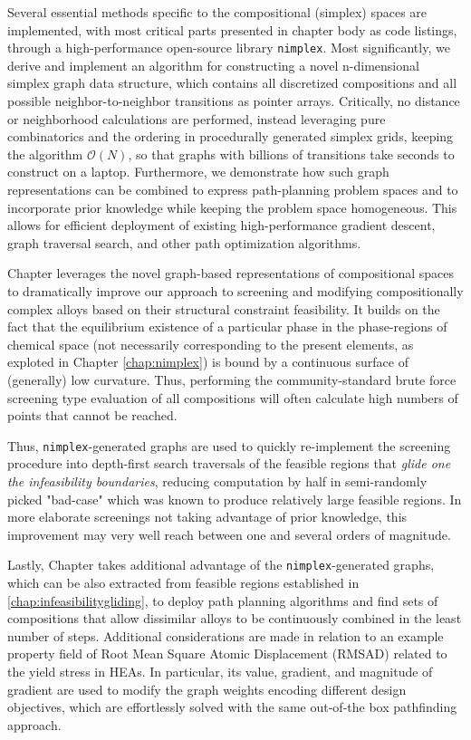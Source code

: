 Several essential methods specific to the compositional (simplex) spaces are implemented, with most critical parts presented in chapter body as code listings, through a high-performance open-source library \texttt{nimplex}. Most significantly, we derive and implement an algorithm for constructing a novel n-dimensional simplex graph data structure, which contains all discretized compositions and all possible neighbor-to-neighbor transitions as pointer arrays. Critically, no distance or neighborhood calculations are performed, instead leveraging pure combinatorics and the ordering in procedurally generated simplex grids, keeping the algorithm $\mathcal{O}(N)$, so that graphs with billions of transitions take seconds to construct on a laptop. Furthermore, we demonstrate how such graph representations can be combined to express path-planning problem spaces and to incorporate prior knowledge while keeping the problem space homogeneous. This allows for efficient deployment of existing high-performance gradient descent, graph traversal search, and other path optimization algorithms.


Chapter  leverages the novel graph-based representations of compositional spaces to dramatically improve our approach to screening and modifying compositionally complex alloys based on their structural constraint feasibility. It builds on the fact that the equilibrium existence of a particular phase in the phase-regions of chemical space (not necessarily corresponding to the present elements, as exploted in Chapter \ref{chap:nimplex}) is bound by a continuous surface of (generally) low curvature. Thus, performing the community-standard brute force screening type evaluation of all compositions will often calculate high numbers of points that cannot be reached.

Thus, \texttt{nimplex}-generated graphs are used to quickly re-implement the screening procedure into depth-first search traversals of the feasible regions that \emph{glide one the infeasibility boundaries}, reducing computation by half in semi-randomly picked "bad-case" which was known to produce relatively large feasible regions. In more elaborate screenings not taking advantage of prior knowledge, this improvement may very well reach between one and several orders of magnitude.


Lastly, Chapter  takes additional advantage of the \texttt{nimplex}-generated graphs, which can be also extracted from feasible regions established in \ref{chap:infeasibilitygliding}, to deploy path planning algorithms and find sets of compositions that allow dissimilar alloys to be continuously combined in the least number of steps. Additional considerations are made in relation to an example property field of Root Mean Square Atomic Displacement (RMSAD) related to the yield stress in HEAs. In particular, its value, gradient, and magnitude of gradient are used to modify the graph weights encoding different design objectives, which are effortlessly solved with the same out-of-the box pathfinding approach.


